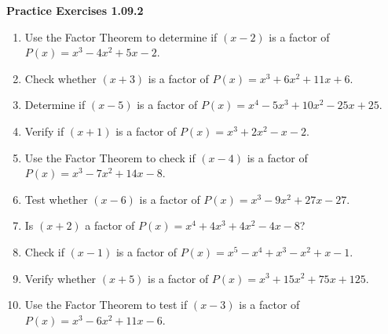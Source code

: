 \vspace{0.3ex}
\noindent\textbf{Practice Exercises 1.09.2}

\vspace{0.2ex}

\begin{enumerate}
    \item Use the Factor Theorem to determine if \( (x - 2) \) is a factor of \( P(x) = x^3 - 4x^2 + 5x - 2 \).
    \item Check whether \( (x + 3) \) is a factor of \( P(x) = x^3 + 6x^2 + 11x + 6 \).
    \item Determine if \( (x - 5) \) is a factor of \( P(x) = x^4 - 5x^3 + 10x^2 - 25x + 25 \).
    \item Verify if \( (x + 1) \) is a factor of \( P(x) = x^3 + 2x^2 - x - 2 \).
    \item Use the Factor Theorem to check if \( (x - 4) \) is a factor of \( P(x) = x^3 - 7x^2 + 14x - 8 \).
    \item Test whether \( (x - 6) \) is a factor of \( P(x) = x^3 - 9x^2 + 27x - 27 \).
    \item Is \( (x + 2) \) a factor of \( P(x) = x^4 + 4x^3 + 4x^2 - 4x - 8 \)?
    \item Check if \( (x - 1) \) is a factor of \( P(x) = x^5 - x^4 + x^3 - x^2 + x - 1 \).
    \item Verify whether \( (x + 5) \) is a factor of \( P(x) = x^3 + 15x^2 + 75x + 125 \).
    \item Use the Factor Theorem to test if \( (x - 3) \) is a factor of \( P(x) = x^3 - 6x^2 + 11x - 6 \).
\end{enumerate}